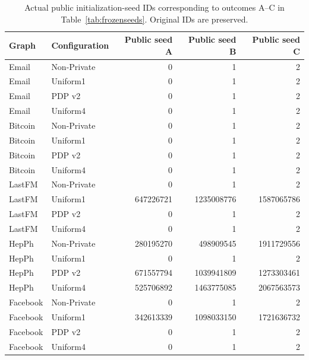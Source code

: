 \begin{table}[htbp]
\centering\scriptsize
\caption{Actual public initialization-seed IDs corresponding to outcomes A--C in Table~\ref{tab:frozenseeds}. Original IDs are preserved.}\label{tab:frozenseedids}
\begin{tabular}{llrrr}
\toprule
Graph & Configuration & Public seed A & Public seed B & Public seed C\\ \midrule
Email & Non-Private & 0 & 1 & 2 \\
Email & Uniform1 & 0 & 1 & 2 \\
Email & PDP v2 & 0 & 1 & 2 \\
Email & Uniform4 & 0 & 1 & 2 \\
Bitcoin & Non-Private & 0 & 1 & 2 \\
Bitcoin & Uniform1 & 0 & 1 & 2 \\
Bitcoin & PDP v2 & 0 & 1 & 2 \\
Bitcoin & Uniform4 & 0 & 1 & 2 \\
LastFM & Non-Private & 0 & 1 & 2 \\
LastFM & Uniform1 & 647226721 & 1235008776 & 1587065786 \\
LastFM & PDP v2 & 0 & 1 & 2 \\
LastFM & Uniform4 & 0 & 1 & 2 \\
HepPh & Non-Private & 280195270 & 498909545 & 1911729556 \\
HepPh & Uniform1 & 0 & 1 & 2 \\
HepPh & PDP v2 & 671557794 & 1039941809 & 1273303461 \\
HepPh & Uniform4 & 525706892 & 1463775085 & 2067563573 \\
Facebook & Non-Private & 0 & 1 & 2 \\
Facebook & Uniform1 & 342613339 & 1098033150 & 1721636732 \\
Facebook & PDP v2 & 0 & 1 & 2 \\
Facebook & Uniform4 & 0 & 1 & 2 \\
\bottomrule\end{tabular}
\end{table}
